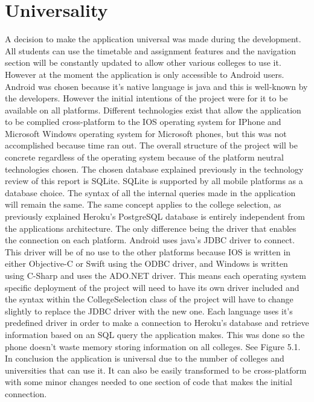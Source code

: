 \section{Universality}
A decision to make the application universal was made during the development. All students can use the timetable and assignment features and the navigation section will be constantly updated to allow other various colleges to use it. However at the moment the application is only accessible to Android users. Android was chosen because it's native language is java and this is well-known by the developers. However the initial intentions of the project were for it to be available on all platforms. Different technologies exist that allow the application to be complied cross-platform to the IOS operating system for IPhone and Microsoft Windows operating system for Microsoft phones, but this was not accomplished because time ran out. The overall structure of the project will be concrete regardless of the operating system because of the platform neutral technologies chosen. The chosen database explained previously in the technology review of this report is SQLite. SQLite is supported by all mobile platforms as a database choice. The syntax of all the internal queries made in the application will remain the same. The same concept applies to the college selection, as previously explained Heroku's PostgreSQL database is entirely independent from the applications architecture. The only difference being the driver that enables the connection on each platform. Android uses java's JDBC driver to connect. This driver will be of no use to the other platforms because IOS is written in either Objective-C or Swift using the ODBC driver, and Windows is written using C-Sharp and uses the ADO.NET driver. This means each operating system specific deployment of the project will need to have its own driver included and the syntax within the CollegeSelection class of the project will have to change slightly to replace the JDBC driver with the new one. Each language uses it's predefined driver in order to make a connection to Heroku's database and retrieve information based on an SQL query the application makes. This was done so the phone doesn't waste memory storing information on all colleges. See Figure 5.1.
In conclusion the application is universal due to the number of colleges and universities that can use it. It can also be easily transformed to be cross-platform with some minor changes needed to one section of code that makes the initial connection.


